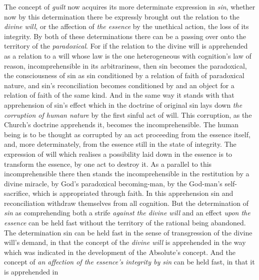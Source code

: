 \documentclass[12pt,a4paper]{book}
\begin{document}
The concept of \emph{guilt} now acquires its more determinate expression in
\emph{sin}, whether now by this determination there be expressly brought out the
relation to the \emph{divine will}, or the affection of \emph{the essence} by
the unethical action,
the loss of its integrity. By both of these determinations there can be a
passing over onto the territory of the \emph{paradoxical}. For if the relation
to the divine will is apprehended as a relation to a will whose law is the one
heterogeneous with cognition's law of reason, incomprehensible in its
arbitrariness, then sin becomes the paradoxical, the consciousness of sin as sin
conditioned by a relation of faith of paradoxical nature, and sin's
reconciliation becomes conditioned by and an object for a relation of faith of
the same kind. And in the same way it stands with that apprehension of sin's
effect which in the doctrine of original sin lays down \emph{the corruption of
human nature} by the first sinful act of will. This corruption, as the Church's
doctrine apprehends it, becomes the incomprehensible. The human being is to be
thought as corrupted by an act proceeding from the essence itself, and, more
determinately, from the essence still in the state of integrity. The expression
of will which realises a possibility laid down in the essence is to transform
the essence, by one act to destroy it. As a parallel to this incomprehensible
there then stands the incomprehensible in the restitution by a divine miracle,
by God's paradoxical becoming-man, by the God-man's self-sacrifice, which is
appropriated through faith. In this apprehension sin and reconciliation withdraw
themselves from all cognition. But the determination of \emph{sin} as
comprehending both a strife \emph{against the divine will} and an effect
\emph{upon the essence} can be held fast without the territory of the rational
being abandoned. The determination sin can be held fast in the sense of
transgression of the divine will's demand, in that the concept of the
\emph{divine will} is apprehended in the way which was indicated in the
development of the Absolute's concept. And the concept of \emph{an affection of
the essence's integrity by sin} can be held fast, in that it is apprehended in
\end{document}
